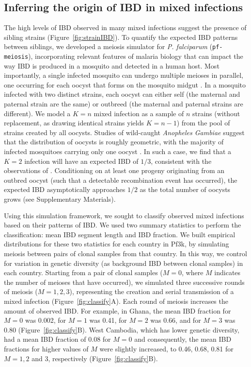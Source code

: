 \documentclass[9pt,lineno]{elife}
\begin{document}
\subsection{Inferring the origin of IBD in mixed infections}

The high levels of IBD observed in many mixed infections suggest the presence of sibling strains (Figure~\ref{fig:strainIBD}). To quantify the expected IBD patterns between siblings, we developed a meiosis simulator for {\it P. falciparum} ({\tt pf-meiosis}), incorporating relevant features of malaria biology that can impact the way IBD is produced in a mosquito and detected in a human host. Most importantly, a single infected mosquito can undergo multiple meioses in parallel, one occurring for each oocyst that forms on the mosquito midgut \citep{Gosh2000}. In a mosquito infected with two distinct strains, each oocyst can either self (the maternal and paternal strain are the same) or outbreed (the maternal and paternal strains are different). We model a $K = n$ mixed infection as a sample of $n$ strains (without replacement, as drawing identical strains yields $K = n-1$) from the pool of strains created by all oocysts. Studies of wild-caught \textit{Anopheles Gambiae} suggest that the distribution of oocysts is roughly geometric, with the majority of infected mosquitoes carrying only one oocyst \citep{Beir1991,Collins1984}. In such a case, we find that a $K=2$ infection will have an expected IBD of $1/3$, consistent with the observations of \citet{Wong2018}.  Conditioning on at least one progeny originating from an outbred oocyst (such that a detectable recombination event has occurred), the expected IBD asymptotically approaches $1/2$ as the total number of oocysts grows (see Supplementary Materials).

Using this simulation framework, we sought to classify observed mixed infections based on their patterns of IBD. We used two summary statistics to perform the classification: mean IBD segment length and IBD fraction. We built empirical distributions for these two statistics for each country in Pf3k, by simulating meiosis between pairs of clonal samples from that country.  In this way, we control for variation in genetic diversity (as background IBD between clonal samples) in each country. Starting from a pair of clonal samples ($M=0$, where $M$ indicates the number of meioses that have occurred), we simulated three successive rounds of meiosis ($M=1, 2, 3$), representing the creation and serial transmission of a mixed infection (Figure~\ref{fig:classify}A). Each round of meiosis increases the amount of observed IBD. For example, in Ghana, the mean IBD fraction for $M=0$ was 0.002, for $M=1$ was 0.41, for $M=2$ was 0.66, and for $M=3$ was 0.80 (Figure~\ref{fig:classify}B). West Cambodia, which has lower genetic diversity, had a mean IBD fraction of 0.08 for $M=0$ and consequently, the mean IBD fractions for higher values of $M$ were slightly increased, to 0.46, 0.68, 0.81 for $M=1, 2$ and $3$, respectively (Figure~\ref{fig:classify}B).
\end{document}
